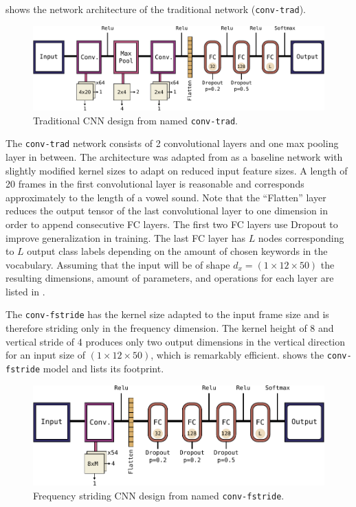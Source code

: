  shows the network architecture of the traditional network (\texttt{conv-trad}).
\begin{figure}[!ht]
  \centering
    \includegraphics[height=0.23\textwidth]{./4_nn/figs/nn_arch_cnn_trad.pdf}
  \caption{Traditional CNN design from \cite{Sainath2015} named \texttt{conv-trad}.}
  \label{fig:nn_arch_cnn_trad}
\end{figure}
\FloatBarrier
\noindent
The \texttt{conv-trad} network consists of 2 convolutional layers and one max pooling layer in between.
The architecture was adapted from \cite{Sainath2015} as a baseline network with slightly modified kernel sizes to adapt on reduced input feature sizes.
A length of 20 frames in the first convolutional layer is reasonable and corresponds approximately to the length of a vowel sound.
Note that the \enquote{Flatten} layer reduces the output tensor of the last convolutional layer to one dimension in order to append consecutive FC layers.
The first two FC layers use Dropout to improve generalization in training.
The last FC layer has $L$ nodes corresponding to $L$ output class labels depending on the amount of chosen keywords in the vocabulary.
Assuming that the input will be of shape $d_x = (1 \times 12 \times 50)$ the resulting dimensions, amount of parameters, and operations for each layer are listed in .


The \texttt{conv-fstride} has the kernel size adapted to the input frame size and is therefore striding only in the frequency dimension.
The kernel height of 8 and vertical stride of 4 produces only two output dimensions in the vertical direction for an input size of $(1 \times 12 \times 50)$, which is remarkably efficient.
 shows the \texttt{conv-fstride} model and  lists its footprint.
\begin{figure}[!ht]
  \centering
    \includegraphics[height=0.23\textwidth]{./4_nn/figs/nn_arch_cnn_fstride.pdf}
  \caption{Frequency striding CNN design from \cite{Sainath2015} named \texttt{conv-fstride}.}
  \label{fig:nn_arch_cnn_fstride}
\end{figure}
\FloatBarrier
\noindent


